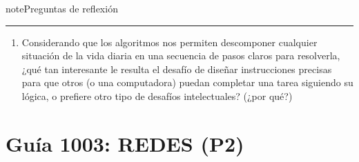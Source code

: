 \documentclass[letterpaper,10pt,spanish]{sphinxmanual}
\begin{document}
\begin{sphinxadmonition}{note}{Preguntas de reflexión}
\begin{enumerate}
\end{enumerate}


\bigskip\hrule\bigskip

\begin{enumerate}
%
\setcounter{enumi}{9}
\item {} 
\sphinxAtStartPar
Considerando que los algoritmos nos permiten descomponer cualquier situación de la vida diaria en una secuencia de pasos claros para resolverla, ¿qué tan interesante le resulta el desafío de diseñar instrucciones precisas para que otros (o una computadora) puedan completar una tarea siguiendo su lógica, o prefiere otro tipo de desafíos intelectuales? (¿por qué?)

\end{enumerate}
\end{sphinxadmonition}

\sphinxstepscope


\section{Guía 1003: REDES (P2)}
\label{\detokenize{1_guias/10informatica/G1003:guia-1003-redes-p2}}\label{\detokenize{1_guias/10informatica/G1003::doc}}
\end{document}
